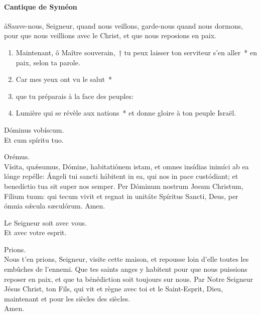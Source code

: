 \documentclass[twoside]{article}
\begin{document}
\begin{paracol}[1]{2}
\switchcolumn

\paragraph{Cantique de Syméon}

\aa Sauve-nous, Seigneur, quand nous veillons, garde-nous quand nous dormons, pour que nous veillions avec le Christ, et que nous reposions en paix.


\begin{enumerate}[wide, itemsep=0mm, labelwidth=!, labelindent=0pt, label=\color{gregoriocolor}\theenumi]
\item Maintenant, ô Maître souverain,~† tu peux laisser ton serviteur s'en aller~* en paix, selon ta parole.
\item Car mes yeux ont vu le salut~*
\item que tu préparais à la face des peuples:
\item Lumière qui se révèle aux nations~* et donne gloire à ton peuple Israël.
\end{enumerate}

\switchcolumn*

%
%
%

\vv Dóminus vobíscum. \\
\rr Et cum spíritu tuo.

Orémus.\\
Vísita, quǽsumus, Dómine, habitatiónem istam, et omnes insídias inimíci ab ea lónge repélle: Ángeli tui sancti hábitent in ea, qui nos in pace custódiant; et benedíctio tua sit super nos semper.
Per Dóminum nostrum Jesum Christum, Fílium tuum: qui tecum vivit et regnat in unitáte Spíritus Sancti, Deus, per ómnia sǽcula sæculórum.
\rr Amen.

\switchcolumn

\vv Le Seigneur soit avec vous. \\
\rr Et avec votre esprit.

Prions. \\
Nous t'en prions, Seigneur, visite cette maison, et repousse loin d'elle toutes les embûches de l'ennemi. Que tes saints anges y habitent pour que nous puissions reposer en paix, et que ta bénédiction soit toujours sur nous.
Par Notre Seigneur Jésus Christ, ton Fils, qui vit et règne avec toi et le Saint-Esprit, Dieu, maintenant et pour les siècles des siècles.\\
\rr Amen.


\end{paracol}
\end{document}

